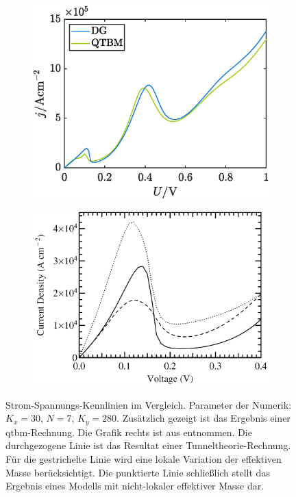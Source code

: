 \begin{figure}
    \centering
    \begin{subfigure}[b]{0.47\textwidth}
        \centering
        \includegraphics[width=\textwidth]{plots/IV/IV_qtbm_dg_grob.eps}
        \caption[]%
        {{}}
        \label{fig:iv1}
    \end{subfigure}
    \hfill
    \begin{subfigure}[b]{0.49\textwidth}
        \centering
        \includegraphics[width=\textwidth]{plots/IV/frensley.png}
        \caption[]%
        {{}}
        \label{fig:frensley_iv}
    \end{subfigure}
    \caption[]
    {Strom-Spannungs-Kennlinien im Vergleich. Parameter der Numerik: $K_x=30$, $N=7$, $K_y=280$. Zusätzlich gezeigt ist das Ergebnis einer \ac{qtbm}-Rechnung. Die Grafik rechts ist aus \cite{frensley3} entnommen. Die durchgezogene Linie ist das Resultat einer Tunneltheorie-Rechnung. Für die gestrichelte Linie wird eine lokale Variation der effektiven Masse berücksichtigt. Die punktierte Linie schließlich stellt das Ergebnis eines Modells mit nicht-lokaler effektiver Masse dar.}
    \label{fig:iv_vergleich1}
\end{figure}
